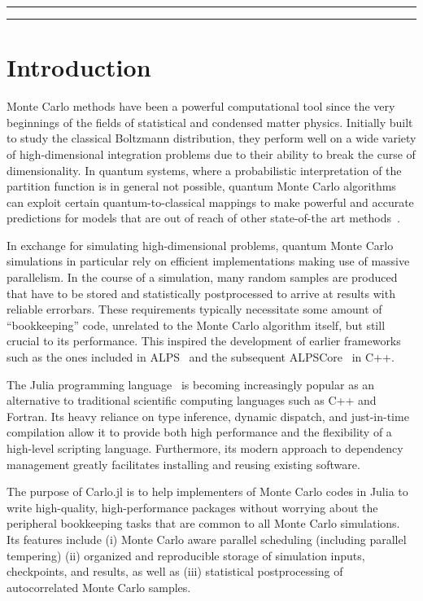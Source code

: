 \documentclass{SciPost}
\begin{document}
\vspace{10pt}
\noindent\rule{\textwidth}{1pt}
\tableofcontents
\noindent\rule{\textwidth}{1pt}
\vspace{10pt}

\section{Introduction}
\label{sec:intro}
Monte Carlo methods have been a powerful computational tool since the very beginnings of the fields of statistical and condensed matter physics\cite{Metropolis1953}. Initially built to study the classical Boltzmann distribution, they perform well on a wide variety of high-dimensional integration problems due to their ability to break the curse of dimensionality. In quantum systems, where a probabilistic interpretation of the partition function is in general not possible, quantum Monte Carlo algorithms can exploit certain quantum-to-classical mappings to make powerful and accurate predictions for models that are out of reach of other state-of-the art methods~\cite{Gubernatis2016}. 

In exchange for simulating high-dimensional problems, quantum Monte Carlo simulations in particular rely on efficient implementations making use of massive parallelism. In the course of a simulation, many random samples are produced that have to be stored and statistically postprocessed to arrive at results with reliable errorbars. These requirements typically necessitate some amount of ``bookkeeping'' code, unrelated to the Monte Carlo algorithm itself, but still crucial to its performance. This inspired the development of earlier frameworks such as the ones included in ALPS~\cite{ALPS} and the subsequent ALPSCore~\cite{ALPSCore} in C++.

The Julia programming language~\cite{Bezanson2012} is becoming increasingly popular as an alternative to traditional scientific computing languages such as C++ and Fortran. Its heavy reliance on type inference, dynamic dispatch, and just-in-time compilation allow it to provide both high performance and the flexibility of a high-level scripting language. Furthermore, its modern approach to dependency management greatly facilitates installing and reusing existing software.

The purpose of Carlo.jl is to help implementers of Monte Carlo codes in Julia to write high-quality, high-performance packages without worrying about the peripheral bookkeeping tasks that are common to all Monte Carlo simulations. Its features include (i) Monte Carlo aware parallel scheduling (including parallel tempering) (ii) organized and reproducible storage of simulation inputs, checkpoints, and results, as well as (iii) statistical postprocessing of autocorrelated Monte Carlo samples.
\end{document}
